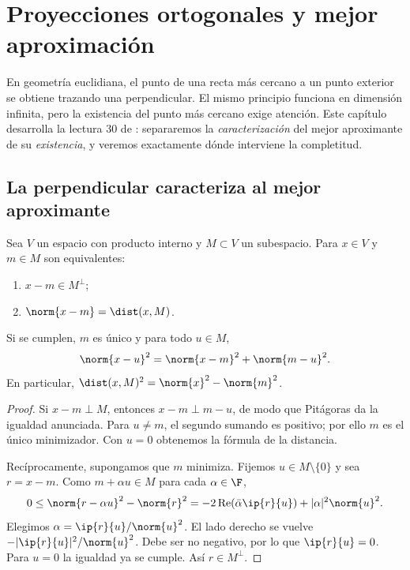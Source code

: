 \chapter{Proyecciones ortogonales y mejor aproximación}\label{chap:30}

En geometría euclidiana, el punto de una recta más cercano a un punto exterior se obtiene trazando una perpendicular. El mismo principio funciona en dimensión infinita, pero la existencia del punto más cercano exige atención. Este capítulo desarrolla la lectura 30 de \cite{valencia}: separaremos la \emph{caracterización} del mejor aproximante de su \emph{existencia}, y veremos exactamente dónde interviene la completitud.

\section{La perpendicular caracteriza al mejor aproximante}
\begin{teorema}\label{ch30:caracterizacion}
Sea $V$ un espacio con producto interno y $M\subset V$ un subespacio. Para $x\in V$ y $m\in M$ son equivalentes:
\begin{enumerate}[label=(\roman*)]
 \item $x-m\in M^{\perp}$;
 \item $\norm{x-m}=\dist(x,M)$.
\end{enumerate}
Si se cumplen, $m$ es único y para todo $u\in M$,
\[
 \norm{x-u}^{2}=\norm{x-m}^{2}+\norm{m-u}^{2}.
\]
En particular, $\dist(x,M)^{2}=\norm{x}^{2}-\norm{m}^{2}$.
\end{teorema}
\begin{proof}
Si $x-m\perp M$, entonces $x-m\perp m-u$, de modo que Pitágoras da la igualdad anunciada. Para $u\ne m$, el segundo sumando es positivo; por ello $m$ es el único minimizador. Con $u=0$ obtenemos la fórmula de la distancia.

Recíprocamente, supongamos que $m$ minimiza. Fijemos $u\in M\setminus\{0\}$ y sea $r=x-m$. Como $m+\alpha u\in M$ para cada $\alpha\in\F$,
\[
0\leq\norm{r-\alpha u}^{2}-\norm{r}^{2}
=-2\operatorname{Re}(\bar\alpha\ip{r}{u})+|\alpha|^{2}\norm{u}^{2}.
\]
Elegimos $\alpha=\ip{r}{u}/\norm{u}^{2}$. El lado derecho se vuelve $-|\ip{r}{u}|^{2}/\norm{u}^{2}$. Debe ser no negativo, por lo que $\ip{r}{u}=0$. Para $u=0$ la igualdad ya se cumple. Así $r\in M^{\perp}$.
\end{proof}

